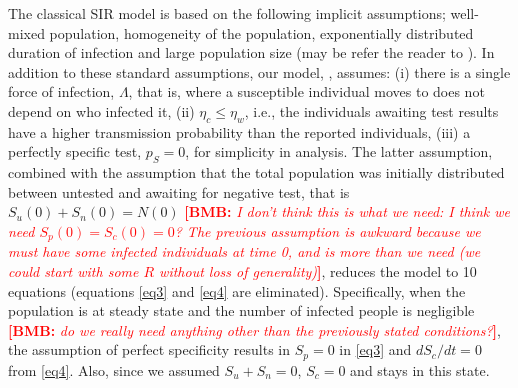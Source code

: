 \documentclass[12pt]{article}
\newcommand{\comment}{\showcomment}
\newcommand{\showcomment}[3]{\textcolor{#1}{\textbf{[#2: }\textsl{#3}\textbf{]}}}
\newcommand{\bmb}[1]{\comment{red}{BMB}{#1}}
\theoremstyle{definition} %
\begin{document}
The classical SIR model is based on the following implicit assumptions; well-mixed population, homogeneity of the population, exponentially distributed duration of infection and large population size (may be refer the reader to \cite{keeling2011modeling}). In addition to these standard assumptions, our model, , assumes: (i) there is a single force of infection, $\Lambda$, that is, where a susceptible individual moves to does not depend on who infected it, (ii) $\eta_c \leq \eta_w$, i.e., the individuals awaiting test results have a higher transmission probability than the reported individuals, (iii) a perfectly specific test, $p_S=0$, for simplicity in analysis. The latter assumption, combined with the assumption that the total population was initially distributed between untested and awaiting for negative test, that is $S_u(0)+S_n(0)=N(0)$ \bmb{I don't think this is what we need: I think we need $S_p(0)=S_c(0)=0$? The previous assumption is awkward because we must have some infected individuals at time 0, and is more than we need (we could start with some $R$ without loss of generality)}, reduces the model to 10 equations (equations \ref{eq3} and \ref{eq4} are eliminated). Specifically, when the population is at steady state and the number of infected people is negligible \bmb{do we really need anything other than the previously stated conditions?}, the assumption of perfect specificity results in $S_p=0$ in \cref{eq3} and $d S_c/dt=0$ from \cref{eq4}. Also, since we assumed $S_u+S_n=0$, $S_c=0$ and stays in this state.
\end{document}

